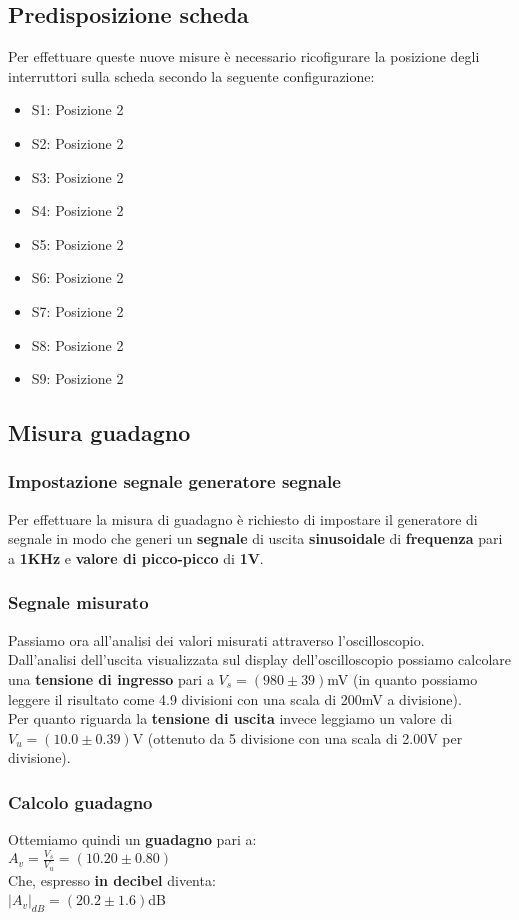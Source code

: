 \documentclass{article}
\begin{document}
\subsection{Predisposizione scheda}
Per effettuare queste nuove misure è necessario ricofigurare la posizione degli interruttori sulla scheda secondo la seguente configurazione:
\begin{itemize}
	\item S1: Posizione 2
	\item S2: Posizione 2
	\item S3: Posizione 2
	\item S4: Posizione 2
	\item S5: Posizione 2
	\item S6: Posizione 2
	\item S7: Posizione 2
	\item S8: Posizione 2
	\item S9: Posizione 2
\end{itemize}
\subsection{Misura guadagno}
\subsubsection{Impostazione segnale generatore segnale}
Per effettuare la misura di guadagno è richiesto di impostare il generatore di segnale in modo che generi un \textbf{segnale} di uscita \textbf{sinusoidale} di \textbf{frequenza} pari a \textbf{1KHz} e \textbf{valore di picco-picco} di \textbf{1V}.

\subsubsection{Segnale misurato}
Passiamo ora all'analisi dei valori misurati attraverso l'oscilloscopio.\\Dall'analisi dell'uscita visualizzata sul display dell'oscilloscopio possiamo calcolare una \textbf{tensione di ingresso} pari a \large $V_s = (980 \pm 39)$mV \normalsize (in quanto possiamo leggere il risultato come 4.9 divisioni con una scala di 200mV a divisione).\\
Per quanto riguarda la \textbf{tensione di uscita} invece leggiamo un valore di \large $V_u = (10.0 \pm 0.39)$V \normalsize (ottenuto da 5 divisione con una scala di 2.00V per divisione).
\subsubsection{Calcolo guadagno}
Ottemiamo quindi un \textbf{guadagno} pari a:\\ \large $A_v = \frac{V_s}{V_u} = (10.20 \pm 0.80)$ \normalsize \\Che, espresso \textbf{in decibel} diventa:\\ \large $ |A_v|_{dB} = (20.2 \pm 1.6)$dB \normalsize
\end{document}

